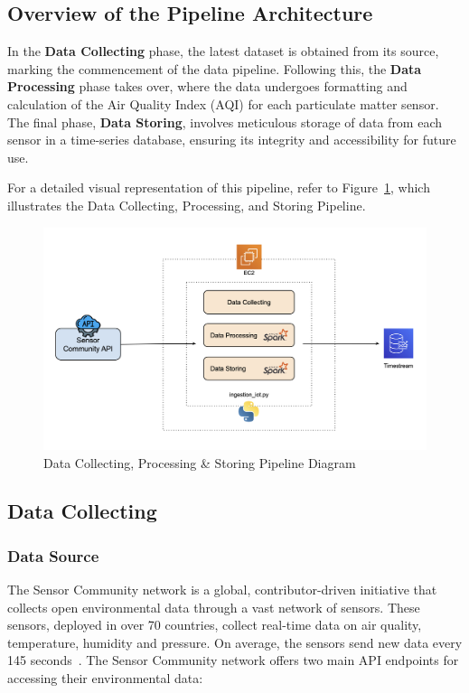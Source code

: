 \documentclass[12pt,oneside]{book} %
\begin{document}
\subsection{Overview of the Pipeline Architecture}

In the \textbf{Data Collecting} phase, the latest dataset is obtained from its
source, marking the commencement of the data pipeline. Following this, the
\textbf{Data Processing} phase takes over, where the data undergoes formatting
and calculation of the Air Quality Index (AQI) for each particulate matter
sensor. The final phase, \textbf{Data Storing}, involves meticulous storage of
data from each sensor in a time-series database, ensuring its integrity and
accessibility for future use.

For a detailed visual representation of this pipeline, refer to
Figure~\ref{fig:data-collecting-processing-storing-pipeline}, which illustrates
the Data Collecting, Processing, and Storing Pipeline.

\begin{figure}[H]
    \centering
    \includegraphics[width=1\linewidth]{images/cloud-computing-data-ingestion.png}
    \caption{Data Collecting, Processing \& Storing Pipeline Diagram}\label{fig:data-collecting-processing-storing-pipeline}
\end{figure}

\subsection{Data Collecting}
\subsubsection{Data Source}
The Sensor Community network is a global, contributor-driven initiative that
collects open environmental data through a vast network of sensors. These
sensors, deployed in over 70 countries, collect real-time data on air quality,
temperature, humidity and pressure. On average, the sensors send new data every
145 seconds~\cite{sensorcommunity2023synchronization}. The Sensor Community
network offers two main API endpoints for accessing their environmental data:
\end{document}
